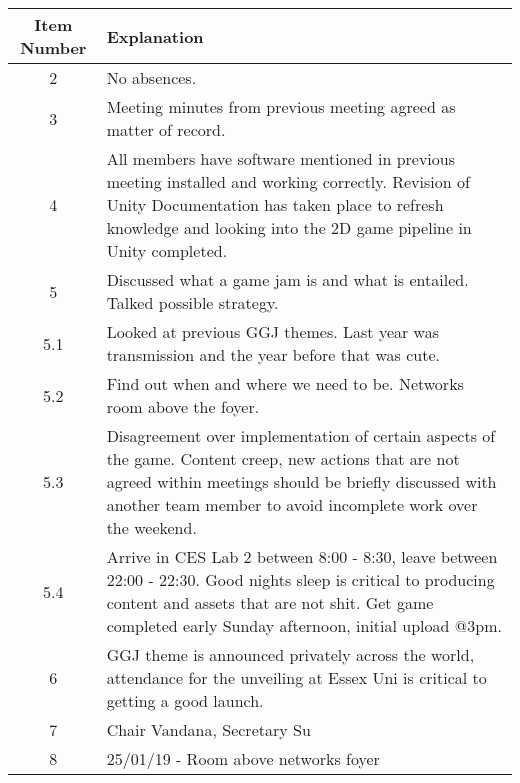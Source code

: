 \documentclass{article}
\begin{document}
\begin{table}[H]
	\centering
	\begin{tabular}{| c | p{9cm} |}
		\hline
		Item Number & Explanation \\ \hline
		2 & No absences.\\ \hline
		3 & Meeting minutes from previous meeting agreed as matter of record. \\ \hline
		4 & All members have software mentioned in previous meeting installed and working correctly. Revision of Unity Documentation has taken place to refresh knowledge and looking into the 2D game pipeline in Unity completed.\\ \hline
		5 & Discussed what a game jam is and what is entailed. Talked possible strategy.\\ \hline
		5.1 & Looked at previous GGJ themes. Last year was transmission and the year before that was cute.\\ \hline
		5.2 & Find out when and where we need to be. Networks room above the foyer. \\ \hline
		5.3 & Disagreement over implementation of certain aspects of the game. Content creep, new actions that are not agreed within meetings should be briefly discussed with another team member to avoid incomplete work over the weekend.\\ \hline
		5.4 & Arrive in CES Lab 2 between 8:00 - 8:30, leave between 22:00 - 22:30. Good nights sleep is critical to producing content and assets that are not shit. Get game completed early Sunday afternoon, initial upload @3pm.\\ \hline 
		6 & GGJ theme is announced privately across the world, attendance for the unveiling at Essex Uni is critical to getting a good launch. \\ \hline
		7 & Chair Vandana, Secretary Su\\ \hline
        8 & 25/01/19 - Room above networks foyer \\ \hline
		
	\end{tabular}
\end{table}
\end{document}
